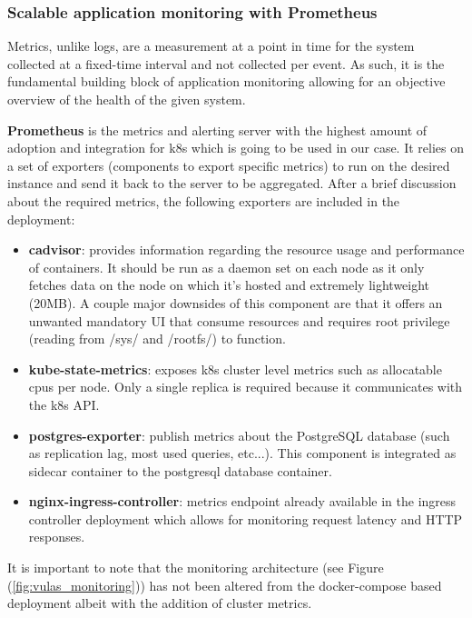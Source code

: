 \documentclass[11pt]{article}
\begin{document}
\subsubsection{Scalable application monitoring with Prometheus}

\hspace{5mm} Metrics, unlike logs, are a measurement at a point in time for the system collected at a fixed-time interval and not collected per event. As such, it is the fundamental building block of application monitoring allowing for an objective overview of the health of the given system. 

\textbf{Prometheus} is the metrics and alerting server with the highest amount of adoption and integration for k8s which is going to be used in our case. It relies on a set of exporters (components to export specific metrics) to run on the desired instance and send it back to the server to be aggregated. After a brief discussion about the required metrics, the following exporters are included in the deployment:
\begin{itemize}
    \item \textbf{cadvisor}: provides information regarding the resource usage and performance of containers. It should be run as a daemon set on each node as it only fetches data on the node on which it's hosted and extremely lightweight (20MB). A couple major downsides of this component are that it offers an unwanted mandatory UI that consume resources and requires root privilege (reading from /sys/ and /rootfs/) to function.
    
    \item \textbf{kube-state-metrics}: exposes k8s cluster level metrics such as allocatable cpus per node. Only a single replica is required because it communicates with the k8s API.
    
    \item \textbf{postgres-exporter}: publish metrics about the PostgreSQL database (such as replication lag, most used queries, etc...). This component is integrated as sidecar container to the postgresql database container.
    
    \item \textbf{nginx-ingress-controller}: metrics endpoint already available in the ingress controller deployment which allows for monitoring request latency and HTTP responses.
\end{itemize}

It is important to note that the monitoring architecture (see Figure (\ref{fig:vulas_monitoring})) has not been altered from the docker-compose based deployment albeit with the addition of cluster metrics. 
\end{document}
